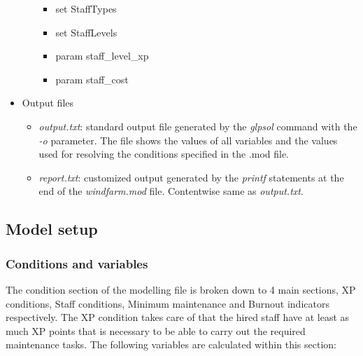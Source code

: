 \begin{itemize}
\begin{itemize}
                \begin{itemize}
                    \item set StaffTypes
                    \item set StaffLevels
                    \item param staff\_level\_xp
                    \item param staff\_cost
                \end{itemize}
            \end{itemize}
        \item Output files
            \begin{itemize}
                \item \textit{output.txt}: standard output file generated by the \textit{glpsol} 
                command with the \textit{-o} parameter. The file shows the values of all variables 
                and the values used for resolving the conditions specified in the .mod file.
                \item \textit{report.txt}: customized output generated by the \textit{printf} 
                statements at the end of the \textit{windfarm.mod} file. Contentwise same as 
                \textit{output.txt}.
            \end{itemize}
    \end{itemize}

    \subsection{Model setup}

        \subsubsection{Conditions and variables} \label{conditions}
        The condition section of the modelling file is broken down to 4 main sections, XP conditions,
        Staff conditions, Minimum maintenance and Burnout indicators respectively. The XP condition 
        takes care of that the hired staff have at least as much XP points that is necessary to be able
        to carry out the required maintenance tasks. The following variables are calculated within this
        section: 
        \newpage
        
